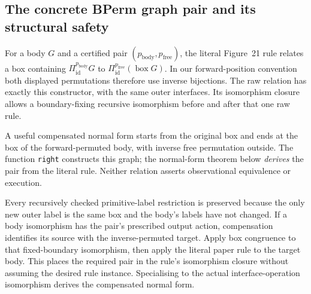 



\subsection{The concrete BPerm graph pair and its structural safety}

For a body $G$ and a certified pair $(p_{\mathrm{body}},p_{\mathrm{free}})$,
the literal Figure~21 rule relates a box containing
$\Pi^{p_{\mathrm{body}}}_{\mathrm{id}}G$ to
$\Pi^{p_{\mathrm{free}}}_{\mathrm{id}}(\operatorname{box}G)$.
In our forward-position convention both displayed permutations therefore use
inverse bijections. The raw relation has exactly this constructor, with the
same outer interfaces. Its isomorphism closure allows a boundary-fixing recursive
isomorphism before and after that one raw rule.

A useful compensated normal form starts from the original box and ends at the
box of the forward-permuted body, with inverse free permutation outside. The
function \texttt{right} constructs this graph; the normal-form theorem below
\emph{derives} the pair from the literal rule. Neither relation asserts
observational equivalence or execution.




Every recursively checked primitive-label restriction is preserved because
the only new outer label is the same box and the body's labels have not changed.
If a body isomorphism has the pair's prescribed output action, compensation
identifies its source with the inverse-permuted target. Apply box congruence to
that fixed-boundary isomorphism, then apply the literal paper rule to the target
body. This places the required pair in the rule's isomorphism closure without
assuming the desired rule instance. Specialising to the actual interface-operation
isomorphism derives the compensated normal form.

